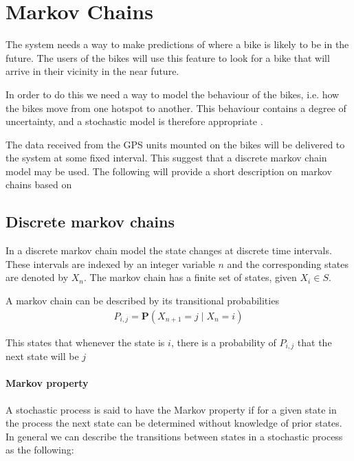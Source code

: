 \section{Markov Chains}\label{markov}
The system needs a way to make predictions of where a bike is likely to be in the future.
The users of the bikes will use this feature to look for a bike that will arrive in their vicinity in the near future.

In order to do this we need a way to model the behaviour of the bikes, i.e. how the bikes move from one hotspot to another.
This behaviour contains a degree of uncertainty, and a stochastic model is therefore appropriate \cite[p. ~296]{bertsekas2002introduction}.

The data received from the GPS units mounted on the bikes will be delivered to the system at some fixed interval.
This suggest that a discrete markov chain model may be used.
The following will provide a short description on markov chains based on \citet[chapter 7]{bertsekas2002introduction}

\subsection{Discrete markov chains}\label{markov:intro}
In a discrete markov chain model the state changes at discrete time intervals. 
These intervals are indexed by an integer variable $ n $ and the corresponding states are denoted by $ X_n $.
The markov chain has a finite set of states, given $X_i \in S$.

A markov chain can be described by its transitional probabilities \begin{align}
P_{i,j} = \mathbf{P} (X_{n+1} = j\mid X_n = i)
\end{align}

This states that whenever the state is $ i $, there is a probability of $ P_{i,j}  $ that the next state will be $ j $

\paragraph{Markov property}\label{markov:property}
A stochastic process is said to have the Markov property if for a given state in the process the next state can be determined without knowledge of prior states.
In general we can describe the transitions between states in a stochastic process as the following:

